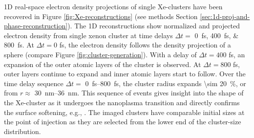 1D real-space electron density projections of single Xe-clusters have been recovered in Figure \ref{fig:Xe-reconstructions} (see methods Section \ref{sec:1d-proj-and-phase-reconstruction}). The 1D reconstructions show normalized and projected electron density from single xenon cluster at time delays $\Delta t=$ \SIlist{0;400;800}{\femto\second}. At $\Delta t = 0$ fs, the electron density follows the density projection of a sphere (compare Figure \ref{fig:cluster-generation}). With a delay of $\Delta t = 400$ fs, an expansion of the outer atomic layers of the cluster is observed. At $\Delta t = 800$ fs, outer layers continue to expand and inner atomic layers start to follow. Over the time delay sequence $\Delta t=$ \SIrange{0}{800}{\femto\second}, the cluster radius expands \SI{\sim 20}{\percent}, or from $r\approx$ \SIrange{30}{36}{\nano\meter}. This sequence of events gives insight into the shape of the Xe-cluster as it undergoes the nanoplasma transition and directly confirms the surface softening, e.g., \citep{Hau-Riege-2004-PRE}. The imaged clusters have comparable initial sizes at the point of injection as they are selected from the lower end of the cluster-size distribution.\\[1\baselineskip]
